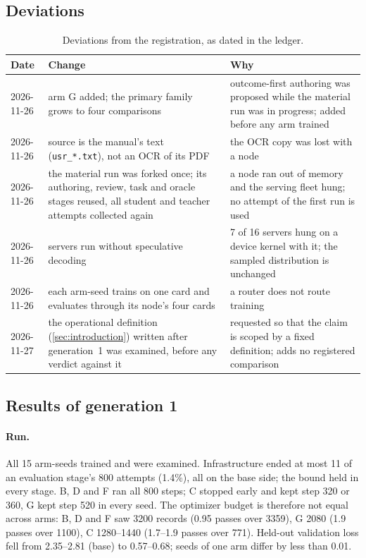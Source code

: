 \subsection{Deviations}\label{sec:vim-deviations}

\begin{table}[h]
\centering\footnotesize
\begin{tabular}{p{17mm}p{64mm}p{60mm}}
\toprule
Date & Change & Why \\
\midrule
2026-11-26 & arm G added; the primary family grows to four comparisons & outcome-first authoring was proposed while the material
run was in progress; added before any arm trained \\
2026-11-26 & source is the manual's text (\texttt{usr\_*.txt}), not an OCR of its PDF & the OCR copy was lost with a node \\
2026-11-26 & the material run was forked once; its authoring, review, task and oracle stages reused, all student and teacher
attempts collected again & a node ran out of memory and the serving fleet hung; no attempt of the first run is used \\
2026-11-26 & servers run without speculative decoding & 7 of 16 servers hung on a device kernel with it; the sampled
distribution is unchanged \\
2026-11-26 & each arm-seed trains on one card and evaluates through its node's four cards & a router does not route training \\
2026-11-27 & the operational definition (\cref{sec:introduction}) written after generation~1 was examined, before any verdict
against it & requested so that the claim is scoped by a fixed definition; adds no registered comparison \\
\bottomrule
\end{tabular}
\caption{Deviations from the registration, as dated in the ledger.}\label{tab:vim-deviations}
\end{table}

\subsection{Results of generation 1}\label{sec:vim-results}

\paragraph{Run.} All 15 arm-seeds trained and were examined. Infrastructure ended at most 11 of an evaluation stage's 800
attempts (1.4\%), all on the base side; the bound held in every stage. B, D and F ran all 800 steps; C stopped early and kept
step 320 or 360, G kept step 520 in every seed. The optimizer budget is therefore not equal across arms: B, D and F saw 3200
records (0.95 passes over 3359), G 2080 (1.9 passes over 1100), C 1280--1440 (1.7--1.9 passes over 771). Held-out validation
loss fell from 2.35--2.81 (base) to 0.57--0.68; seeds of one arm differ by less than 0.01.

